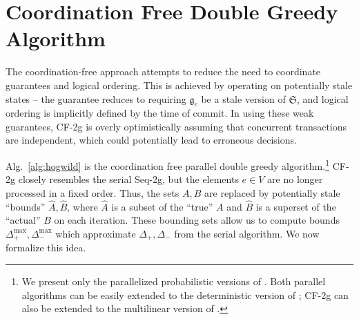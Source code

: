 \documentclass{article} %
\newcommand{\hogwild}{CF-2g}
\newcommand{\seqalg}{Seq-2g}
\newcommand{\Comments}{1}
\newcommand{\note}[2]{\ifnum\Comments=1\textcolor{#1}{#2}\fi}
\newcommand{\xinghao}[1]{\note{red}{[XP: #1]}}
\newcommand{\algref}[1]{Alg.~\ref{#1}}
\begin{document}
\begin{figure}[h]
\begin{multicols}{2}
\begin{minipage}{0.49\textwidth}
    \end{minipage}



  \end{multicols}
  \label{fig:submax}
\end{figure}








\section{Coordination Free Double Greedy Algorithm \label{sec:alghogwild}}
The coordination-free approach attempts to reduce the need to coordinate guarantees and logical ordering.
This is achieved by operating on potentially stale states -- the guarantee reduces to requiring $\mathfrak{g}_e$ be a stale version of $\mathfrak{S}$, and logical ordering is implicitly defined by the time of commit.
In using these weak guarantees, \hogwild{} is overly optimistically assuming that concurrent transactions are independent, which could potentially lead to erroneous decisions.

\algref{alg:hogwild} is the coordination free parallel double greedy algorithm.\footnote{We present only the parallelized probabilistic versions of \cite{buchbinder2012}. Both parallel algorithms can be easily extended to the deterministic version of \cite{buchbinder2012}; \hogwild{} can also be extended to the multilinear version of \cite{buchbinder2012}.}
\hogwild{} closely resembles the serial \seqalg{}, but the elements $e \in V$ are no longer processed in a fixed order.  Thus, the sets $A, B$ are replaced by potentially stale ``bounds'' $\hat{A}, \hat{B}$, where $\hat{A}$ is a subset of the ``true'' $A$ and $\hat{B}$ is a superset of the ``actual'' $B$ on each iteration.
These bounding sets allow us to compute bounds $\Delta_{+}^{\max}, \Delta_{-}^{\max}$ which approximate $\Delta_{+}, \Delta_{-}$ from the serial algorithm.
We now formalize this idea.
\end{document}
